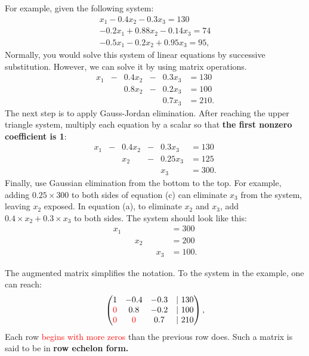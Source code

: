 \documentclass[10pt,a4paper]{book}
\newcommand{\red}[1]{\textcolor{red}{#1}}
\theoremstyle{definition}\newtheorem{definition}{Definition}
\theoremstyle{definition}\newtheorem{fact}{Fact}
\theoremstyle{definition}\newtheorem{ex}{Ex.}
\theoremstyle{definition}\newtheorem{project}{Project}
\theoremstyle{definition}\newtheorem{problem}{Problem}
\theoremstyle{definition}\newtheorem{example}{Example}
\numberwithin{theorem}{chapter}
\numberwithin{corollary}{chapter}
\numberwithin{assumption}{chapter}
\numberwithin{definition}{chapter}
\numberwithin{prop}{chapter}
\numberwithin{notation}{chapter}
\numberwithin{problem}{chapter}
\numberwithin{example}{chapter}
\numberwithin{fact}{chapter}
\numberwithin{ex}{chapter}
\begin{document}
	For example, given the following system:
	\begin{align*}
		x_1 - 0.4 x_2 - 0.3 x_3 = 130       \\
		-0.2 x_1 + 0.88 x_2 - 0.14 x_3 = 74 \\
		-0.5 x_1 - 0.2 x_2 + 0.95 x_3 = 95, 
	\end{align*}
	Normally, you would solve this system of linear equations by successive substitution. However, we can solve it by using matrix operations. 
	\begin{align*}
		x_1 & - & 0.4 x_2 & - & 0.3 x_3 & = 130  \\
		&   & 0.8 x_2 & - & 0.2 x_3 & = 100  \\
		&   &         &   & 0.7 x_3 & = 210. 
	\end{align*}
	The next step is to apply Gauss-Jordan elimination. After reaching the upper triangle system, multiply each equation by a scalar so that \textbf{the first nonzero coefficient is 1}:
	\begin{align*}
		x_1 & - & 0.4 x_2 & - & 0.3 x_3  & = 130  \\
		&   & x_2     & - & 0.25 x_3 & = 125  \\
		&   &         &   & x_3      & = 300. 
	\end{align*}
	Finally, use Gaussian elimination from the bottom to the top. For example, adding $0.25\times300$ to both sides of equation (c) can eliminate $x_3$ from the system, leaving $x_2$ exposed. In equation (a), to eliminate $x_2$ and $x_3$, add $0.4\times x_2 + 0.3\times x_3$ to both sides. The system should look like this:
	\begin{align*}
		x_1 &   &     &   &     & = 300  \\
		&   & x_2 &   &     & = 200  \\
		&   &     &   & x_3 & = 100. 
	\end{align*}
	
	The augmented matrix simplifies the notation. To the system in the example, one can reach:
	\begin{align*}
		\begin{pmatrix}
			1       & -0.4    & -0.3 & | \ 130  \\
			\red{0} & 0.8     & -0.2 & | \  100 \\
			\red{0} & \red{0} & 0.7  & | \ 210  \\
		\end{pmatrix},
	\end{align*}
	Each row \red{begins with more zeros} than the previous row does. Such a matrix is said to be in \textbf{row echelon form.}
	
\end{document}

